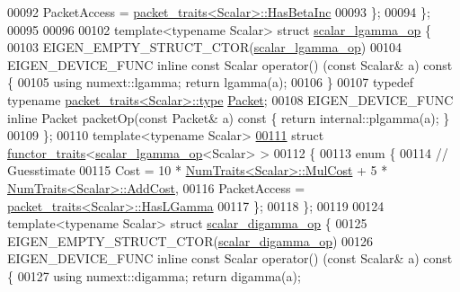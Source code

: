 \begin{DoxyCode}
00092     PacketAccess = \hyperlink{struct_eigen_1_1internal_1_1packet__traits}{packet\_traits<Scalar>::HasBetaInc}
00093   \};
00094 \};
00095 
00096 
00102 \textcolor{keyword}{template}<\textcolor{keyword}{typename} Scalar> \textcolor{keyword}{struct }\hyperlink{struct_eigen_1_1internal_1_1scalar__lgamma__op}{scalar\_lgamma\_op} \{
00103   EIGEN\_EMPTY\_STRUCT\_CTOR(\hyperlink{struct_eigen_1_1internal_1_1scalar__lgamma__op}{scalar\_lgamma\_op})
00104   EIGEN\_DEVICE\_FUNC \textcolor{keyword}{inline} \textcolor{keyword}{const} Scalar operator() (\textcolor{keyword}{const} Scalar& a)\textcolor{keyword}{ const }\{
00105     \textcolor{keyword}{using} numext::lgamma; \textcolor{keywordflow}{return} lgamma(a);
00106   \}
00107   \textcolor{keyword}{typedef} \textcolor{keyword}{typename} \hyperlink{struct_eigen_1_1internal_1_1packet__traits}{packet\_traits<Scalar>::type} \hyperlink{union_eigen_1_1internal_1_1_packet}{Packet};
00108   EIGEN\_DEVICE\_FUNC \textcolor{keyword}{inline} Packet packetOp(\textcolor{keyword}{const} Packet& a)\textcolor{keyword}{ const }\{ \textcolor{keywordflow}{return} internal::plgamma(a); \}
00109 \};
00110 \textcolor{keyword}{template}<\textcolor{keyword}{typename} Scalar>
\hyperlink{struct_eigen_1_1internal_1_1functor__traits_3_01scalar__lgamma__op_3_01_scalar_01_4_01_4}{00111} \textcolor{keyword}{struct }\hyperlink{struct_eigen_1_1internal_1_1functor__traits}{functor\_traits}<\hyperlink{struct_eigen_1_1internal_1_1scalar__lgamma__op}{scalar\_lgamma\_op}<Scalar> >
00112 \{
00113   \textcolor{keyword}{enum} \{
00114     \textcolor{comment}{// Guesstimate}
00115     Cost = 10 * \hyperlink{group___core___module_struct_eigen_1_1_num_traits}{NumTraits<Scalar>::MulCost} + 5 * 
      \hyperlink{group___core___module_struct_eigen_1_1_num_traits}{NumTraits<Scalar>::AddCost},
00116     PacketAccess = \hyperlink{struct_eigen_1_1internal_1_1packet__traits}{packet\_traits<Scalar>::HasLGamma}
00117   \};
00118 \};
00119 
00124 \textcolor{keyword}{template}<\textcolor{keyword}{typename} Scalar> \textcolor{keyword}{struct }\hyperlink{struct_eigen_1_1internal_1_1scalar__digamma__op}{scalar\_digamma\_op} \{
00125   EIGEN\_EMPTY\_STRUCT\_CTOR(\hyperlink{struct_eigen_1_1internal_1_1scalar__digamma__op}{scalar\_digamma\_op})
00126   EIGEN\_DEVICE\_FUNC \textcolor{keyword}{inline} \textcolor{keyword}{const} Scalar operator() (\textcolor{keyword}{const} Scalar& a)\textcolor{keyword}{ const }\{
00127     \textcolor{keyword}{using} numext::digamma; \textcolor{keywordflow}{return} digamma(a);

\end{DoxyCode}

